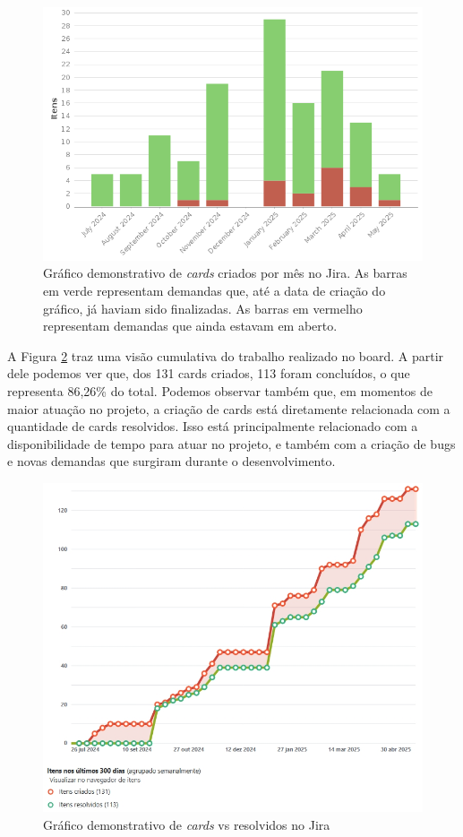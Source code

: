 \begin{figure}[H]
    \centering
    \includegraphics[width=\textwidth]{imagens/itensMes.png}
    \caption{Gráfico demonstrativo de \textit{cards} criados por mês no Jira. As 
    barras em verde representam demandas que, até a data de criação do gráfico, já haviam sido finalizadas.
    As barras em vermelho representam demandas que ainda estavam em aberto.}
    \label{gra:cards-mes}
\end{figure}

A Figura \ref{gra:cards-vs-resolvidos} traz uma visão cumulativa do trabalho realizado no board.
A partir dele podemos ver que, dos 131 cards criados, 113 foram concluídos, o que representa 86,26\% 
do total. Podemos observar também que, em momentos de maior atuação no projeto, a criação de 
cards está diretamente relacionada com a quantidade de cards resolvidos.
Isso está principalmente relacionado com a disponibilidade de tempo para atuar no projeto, e também
com a criação de bugs e novas demandas que surgiram durante o desenvolvimento.

\begin{figure}[H]
    \centering
    \includegraphics[width=\textwidth]{imagens/burnup-jira.jpeg}
    \caption{Gráfico demonstrativo de \textit{cards} vs resolvidos no Jira}
    \label{gra:cards-vs-resolvidos}
\end{figure}

